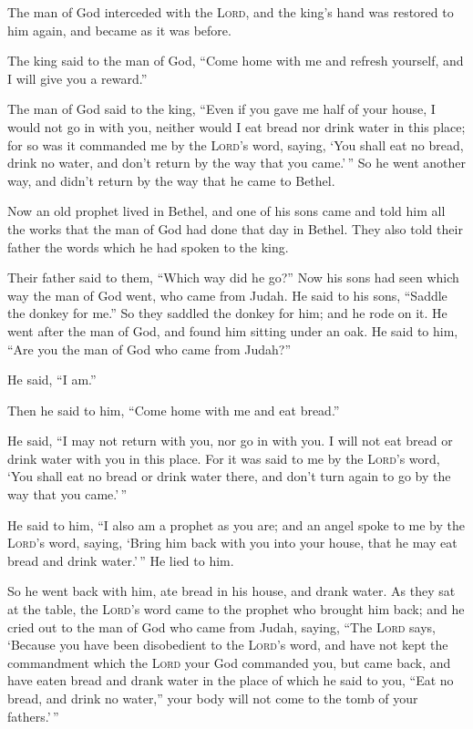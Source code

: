 The man of God interceded with the \textsc{Lord}, and the king's hand
was restored to him again, and became as it was before.

 The king said to the man of God, ``Come home with me and
refresh yourself, and I will give you a reward.''

 The man of God said to the king, ``Even if you gave me
half of your house, I would not go in with you, neither would I eat
bread nor drink water in this place;  for so was it
commanded me by the \textsc{Lord}'s word, saying, `You shall eat no
bread, drink no water, and don't return by the way that you came.'\,''
 So he went another way, and didn't return by the way
that he came to Bethel.

 Now an old prophet lived in Bethel, and one of his sons
came and told him all the works that the man of God had done that day in
Bethel. They also told their father the words which he had spoken to the
king.

 Their father said to them, ``Which way did he go?'' Now
his sons had seen which way the man of God went, who came from Judah.
 He said to his sons, ``Saddle the donkey for me.'' So
they saddled the donkey for him; and he rode on it.  He
went after the man of God, and found him sitting under an oak. He said
to him, ``Are you the man of God who came from Judah?''

He said, ``I am.''

 Then he said to him, ``Come home with me and eat
bread.''

 He said, ``I may not return with you, nor go in with
you. I will not eat bread or drink water with you in this place.
 For it was said to me by the \textsc{Lord}'s word, `You
shall eat no bread or drink water there, and don't turn again to go by
the way that you came.'\,''

 He said to him, ``I also am a prophet as you are; and an
angel spoke to me by the \textsc{Lord}'s word, saying, `Bring him back
with you into your house, that he may eat bread and drink water.'\,'' He
lied to him.

 So he went back with him, ate bread in his house, and
drank water.  As they sat at the table, the
\textsc{Lord}'s word came to the prophet who brought him back;
 and he cried out to the man of God who came from Judah,
saying, ``The \textsc{Lord} says, `Because you have been disobedient to
the \textsc{Lord}'s word, and have not kept the commandment which the
\textsc{Lord} your God commanded you,  but came back, and
have eaten bread and drank water in the place of which he said to you,
``Eat no bread, and drink no water,'' your body will not come to the
tomb of your fathers.'\,''

